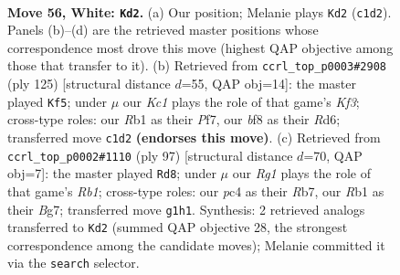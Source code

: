 \documentclass[11pt]{article}
\begin{document}
\clearpage

\begin{figure}[p]\centering
\begin{subfigure}{0.46\textwidth}\centering
\resizebox{\linewidth}{!}{%
\newchessgame
\chessboard[
  setfen={1r1k1b2/6p1/p1p4r/Pp1b1p1p/2p2P1P/2B1P1P1/1P5N/1RK3R1 w - - 13 56},
  showmover=false,
  pgfstyle=straightmove, color=movearrow, markmove={c1-d2}
]}
\caption{}
\end{subfigure}\hfill
\begin{subfigure}{0.46\textwidth}\centering
\resizebox{\linewidth}{!}{%
\newchessgame
\chessboard[
  setfen={8/r4p2/1p1r1k2/1B1p3p/P1pPp2P/4PbP1/PR3P2/1R4K1 b - - 38 63},
  showmover=false,
  pgfstyle=straightmove, color=movearrow, markmove={f6-f5}
]}
\caption{}
\end{subfigure}
\\[4pt]
\begin{subfigure}{0.46\textwidth}\centering
\resizebox{\linewidth}{!}{%
\newchessgame
\chessboard[
  setfen={1r3k2/1r2p1b1/p2pP1p1/PnpP1pPp/2B2P1P/1P1R3R/8/2B1K3 b - - 22 49},
  showmover=false,
  pgfstyle=straightmove, color=movearrow, markmove={b8-d8}
]}
\caption{}
\end{subfigure}\hfill

\caption{\textbf{Move 56, White: \texttt{Kd2}.} (a) Our position; Melanie plays \texttt{Kd2} (\texttt{c1d2}). Panels (b)--(d) are the retrieved master positions whose correspondence most drove this move (highest QAP objective among those that transfer to it). (b) Retrieved from \texttt{ccrl\_top\_p0003\#2908} (ply 125) [structural distance $d$=55, QAP obj=14]: the master played \texttt{Kf5}; under $\mu$ our \emph{Kc1} plays the role of that game's \emph{Kf3}; cross-type roles: our \emph{R}b1 as their \emph{P}f7, our \emph{b}f8 as their \emph{R}d6; transferred move \texttt{c1d2} \textbf{(endorses this move)}. (c) Retrieved from \texttt{ccrl\_top\_p0002\#1110} (ply 97) [structural distance $d$=70, QAP obj=7]: the master played \texttt{Rd8}; under $\mu$ our \emph{Rg1} plays the role of that game's \emph{Rb1}; cross-type roles: our \emph{p}c4 as their \emph{R}b7, our \emph{R}b1 as their \emph{B}g7; transferred move \texttt{g1h1}. Synthesis: 2 retrieved analogs transferred to \texttt{Kd2} (summed QAP objective 28, the strongest correspondence among the candidate moves); Melanie committed it via the \texttt{search} selector.}
\label{fig:thought-m110}
\end{figure}

\clearpage
\end{document}
